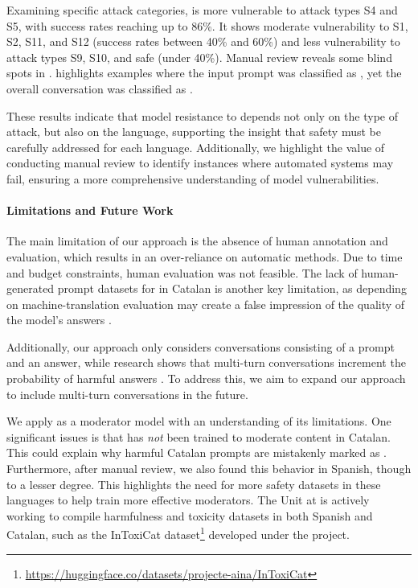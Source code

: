 Examining specific attack categories,
\SalamandraInstructedVII{} is more vulnerable to attack types S4 and S5, with success rates reaching up to 86\%. It shows moderate vulnerability to S1, S2, S11, and S12 (success rates between 40\% and 60\%) and less vulnerability to attack types S9, S10, and safe (under 40\%). Manual review reveals some blind spots in \LlamaGuard{}.  highlights examples where the input prompt was classified as \safeAnswer{}, yet the overall conversation was classified as \unsafeAnswer{}.

These results indicate that model resistance to \RedTeaming{} depends not only on the type of attack, but also on the language, supporting the insight that \LLM{} safety must be carefully addressed for each language. Additionally, we highlight the value of conducting manual review to identify instances where automated systems may fail, ensuring a more comprehensive understanding of model vulnerabilities.




\paragraph{Limitations and Future Work}

The main limitation of our \RedTeaming{} approach is the absence of human annotation and evaluation, which results in an over-reliance on automatic methods. Due to time and budget constraints, human evaluation was not feasible. The lack of human-generated prompt datasets for \RedTeaming{} in Catalan is another key limitation, as depending on machine-translation evaluation may create a false impression of the quality of the model's answers
\cite{chen_bad_multilingua_evaluation}.

Additionally, our \RedTeaming{} approach only considers conversations consisting of a prompt and an answer, while research shows that multi-turn conversations increment the probability of harmful answers \cite{wolf_fundamental_limitations_alignment}. To address this, we aim to expand our approach to include multi-turn conversations in the future.


We apply \LlamaGuard{} as a moderator model with an understanding of its limitations. 
One significant issues is that \LlamaGuard{} has \emph{not} been trained to moderate content in Catalan. This could explain why harmful Catalan prompts are mistakenly marked as \safeAnswer{}. 
Furthermore, after manual review, we also found this behavior in Spanish, though to a lesser degree. 
This highlights the need for more safety datasets in these languages to help train more effective moderators. The \Langtech{} Unit at \BscShort{} is actively working to compile harmfulness and toxicity datasets in both Spanish and Catalan, such as the InToxiCat dataset\footnote{\url{https://huggingface.co/datasets/projecte-aina/InToxiCat}} \cite{gonzalez-agirre-etal-2024-building-data} developed under the \AinaProject{} project.

